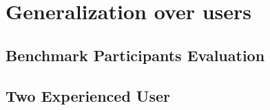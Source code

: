 
\section{Generalization over users}\label{ord:ch5:sec_3_generalization_user}



\subsection{Benchmark Participants Evaluation}\label{ord:ch5:sec3:subsec1}




\subsection{Two Experienced User} \label{ord:ch5:sec3:subsec2_cmo_afe}


